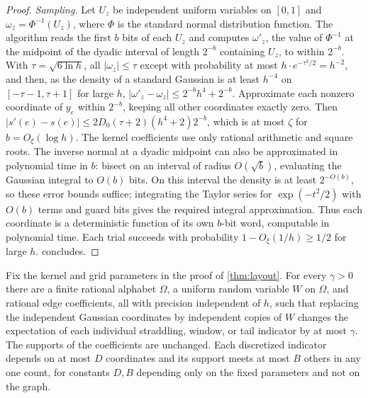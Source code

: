 \documentclass[11pt]{article}
\theoremstyle{plain}
\theoremstyle{definition}
\theoremstyle{remark}
\newcommand{\card}[1]{\lvert #1\rvert}
\begin{document}
\begin{proof}
\emph{Sampling.} Let $U_z$ be independent uniform variables on $[0,1]$ and
$\omega_z = \Phi^{-1}(U_z)$, where $\Phi$ is the standard normal distribution function. The
algorithm reads the first $b$ bits of each $U_z$ and computes $\omega'_z$, the value of $\Phi^{-1}$
at the midpoint of the dyadic interval of length $2^{-b}$ containing $U_z$, to within $2^{-b}$.
With $\tau = \sqrt{6\ln h}$, all $\card{\omega_z} \le \tau$ except with probability at most
$h\cdot e^{-\tau^2/2} = h^{-2}$, and then, as the density of a standard Gaussian is at least
$h^{-4}$ on $[-\tau - 1, \tau + 1]$ for large $h$, $\card{\omega'_z - \omega_z} \le 2^{-b}h^4 + 2^{-b}$.
Approximate each nonzero coordinate of $y_e$ within $2^{-b}$, keeping all other coordinates
exactly zero. Then
$\card{s'(e) - s(e)} \le 2D_0(\tau + 2)(h^4 + 2)2^{-b}$, which is at most $\zeta$ for
$b = O_\xi(\log h)$. The kernel coefficients use only rational arithmetic and square roots.
The inverse normal at a dyadic midpoint can also be approximated in polynomial time in $b$:
bisect on an interval of radius $O(\sqrt b)$, evaluating the Gaussian integral to $O(b)$ bits.
On this interval the density is at least $2^{-O(b)}$, so these error bounds suffice;
integrating the Taylor series for $\exp(-t^2/2)$ with $O(b)$ terms and guard bits gives the
required integral approximation. Thus each coordinate is a deterministic function of its
own $b$-bit word, computable in polynomial time. Each trial succeeds with probability
$1-O_\xi(1/h)\ge 1/2$ for large $h$.  concludes.
\end{proof}

\begin{lemma}
\label{lem:local-discretization}
Fix the kernel and grid parameters in the proof of \cref{thm:layout}. For every $\gamma>0$
there are a finite rational alphabet $\Omega$, a uniform random variable $W$ on $\Omega$, and
rational edge coefficients, all with precision independent of $h$, such that replacing the
independent Gaussian coordinates by independent copies of $W$ changes the expectation of
each individual straddling, window, or tail indicator by at most $\gamma$. The supports of the
coefficients are unchanged. Each discretized indicator depends on at most $D$ coordinates
and its support meets at most $B$ others in any one count, for constants $D,B$ depending only
on the fixed parameters and not on the graph.
\end{lemma}
\end{document}
